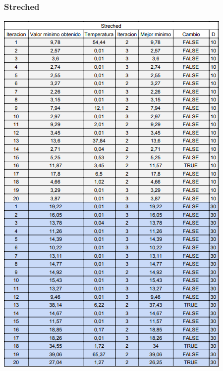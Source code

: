 \documentclass[10pt]{article}
\begin{document}
\subsubsection{Streched}
\begin{center}
  \includegraphics[scale=0.5]{imgs/streched.png}
\end{center}
\end{document}
